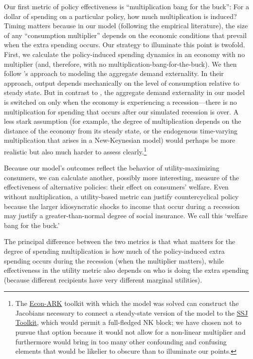 \documentclass[\econtexRoot/HAFiscal]{subfiles}
\begin{document}
Our first metric of policy effectiveness is ``multiplication bang for the buck'': For a dollar of spending on a particular policy, how much multiplication is induced?  Timing matters because in our model (following the empirical literature), the size of any ``consumption multiplier'' depends on the economic conditions that prevail when the extra spending occurs.  Our strategy to illuminate this point is twofold.  First, we calculate the policy-induced spending dynamics in an economy with no multiplier (and, therefore, with no multiplication-bang-for-the-buck).  We then follow \cite{kmpHandbook2016}'s approach to modeling the aggregate demand externality.  In their approach, output depends mechanically on the level of consumption relative to steady state. But in contrast to \cite{kmpHandbook2016}, the aggregate demand externality in our model is switched on only when the economy is experiencing a recession---there is no multiplication for spending that occurs after our simulated recession is over.  A less stark assumption (for example, the degree of multiplication depends on the distance of the economy from its steady state, or the endogenous time-varying multiplication that arises in a New-Keynesian model) would perhaps be more realistic but also much harder to assess clearly.\footnote{The \href{https://econ-ark.org}{Econ-ARK} toolkit with which the model was solved can construct the Jacobians necessary to connect a steady-state version of the model to the \href{https://github.com/shade-econ/sequence-jacobian}{SSJ Toolkit}, which would permit a full-fledged NK block; we have chosen not to pursue that option because it would not allow for a non-linear multiplier and furthermore would bring in too many other confounding and confusing elements that would be likelier to obscure than to illuminate our points.}

Because our model's outcomes reflect the behavior of utility-maximizing consumers, we can calculate another, possibly more interesting, measure of the effectiveness of alternative policies:  their effect on consumers' welfare.  Even without multiplication, a utility-based metric can justify countercyclical policy because the larger idiosyncratic shocks to income that occur during a recession may justify a greater-than-normal degree of social insurance.  We call this `welfare bang for the buck.'

The principal difference between the two metrics is that what matters for the degree of spending multiplication is how much of the policy-induced extra spending occurs during the recession (when the multiplier matters), while effectiveness in the utility metric also depends on who is doing the extra spending (because different recipients have very different marginal utilities).
\end{document}
